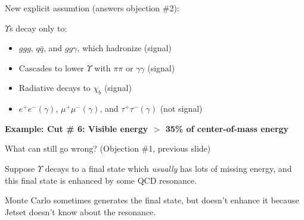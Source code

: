 \documentclass[landscape]{article}
\begin{document}
\vfill

\begin{center}\begin{minipage}{0.8\linewidth}

\begin{center} New explicit assumtion (answers objection \#2): \end{center}

\vspace{0.3 cm}

$\Upsilon$s decay only to:

\begin{center}\begin{minipage}{0.9\linewidth}
\begin{itemize}

  \item $ggg$, $q\bar{q}$, and $gg\gamma$, which hadronize (signal)

  \item Cascades to lower $\Upsilon$ with $\pi\pi$ or $\gamma\gamma$ (signal)

  \item Radiative decays to $\chi_b$ (signal)

  \item $e^+e^-(\gamma)$, $\mu^+\mu^-(\gamma)$, and
  $\tau^+\tau^-(\gamma)$ (not signal)

\end{itemize}\end{minipage}\end{center}

\end{minipage}\end{center}

\vfill

\pagebreak

{\bf Example: Cut \# 6: Visible energy $>$ 35\% of center-of-mass energy}

\vfill

What can still go wrong?  (Objection \#1, previous slide)

\vfill

Suppose $\Upsilon$ decays to a final state which {\it usually} has
lots of missing energy, and this final state is enhanced by some QCD
resonance.

\vfill

Monte Carlo sometimes generates the final state, but doesn't enhance
it because Jetset doesn't know about the resonance.

\vfill
\end{document}

